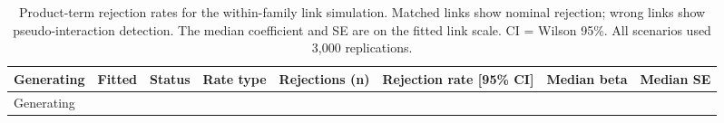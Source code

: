 \documentclass[
  man,
  floatsintext,
  longtable,
  nolmodern,
  notxfonts,
  notimes,
  colorlinks=true,linkcolor=blue,citecolor=blue,urlcolor=blue]{apa7}
\begin{document}
\begin{longtable}[]{@{}
  >{\raggedright\arraybackslash}p{}
  >{\raggedright\arraybackslash}p{}
  >{\raggedright\arraybackslash}p{}
  >{\raggedright\arraybackslash}p{}
  >{\raggedleft\arraybackslash}p{}
  >{\raggedright\arraybackslash}p{}
  >{\raggedright\arraybackslash}p{}
  >{\raggedright\arraybackslash}p{}@{}}
\caption{Product-term rejection rates for the within-family link
simulation. Matched links show nominal rejection; wrong links show
pseudo-interaction detection. The median coefficient and SE are on the
fitted link scale. CI = Wilson 95\%. All scenarios used 3,000
replications.}\label{tbl-rejection-within-family}\tabularnewline
\toprule\noalign{}
\begin{minipage}[b]{\linewidth}\raggedright
Generating
\end{minipage} & \begin{minipage}[b]{\linewidth}\raggedright
Fitted
\end{minipage} & \begin{minipage}[b]{\linewidth}\raggedright
Status
\end{minipage} & \begin{minipage}[b]{\linewidth}\raggedright
Rate type
\end{minipage} & \begin{minipage}[b]{\linewidth}\raggedleft
Rejections (n)
\end{minipage} & \begin{minipage}[b]{\linewidth}\raggedright
Rejection rate {[}95\% CI{]}
\end{minipage} & \begin{minipage}[b]{\linewidth}\raggedright
Median beta
\end{minipage} & \begin{minipage}[b]{\linewidth}\raggedright
Median SE
\end{minipage} \\
\midrule\noalign{}
\endfirsthead
\toprule\noalign{}
\begin{minipage}[b]{\linewidth}\raggedright
Generating
\end{minipage} & \begin{minipage}[b]{\linewidth}\raggedright

\end{minipage}
\end{longtable}
\end{document}

